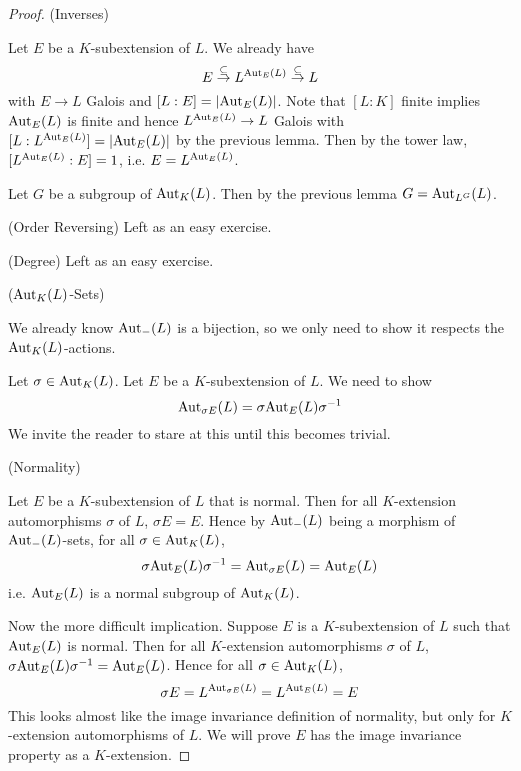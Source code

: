 \documentclass[../book.tex]{subfiles}
\begin{document}
\begin{proof}
    (Inverses)
        
        Let $E$ be a $K$-subextension of $L$. 
        We already have \[
            E \overset{\subseteq}{\to} L^{\text{Aut}_{E}(L)} \overset{\subseteq}{\to} L
        \]
        with $E \to L$ Galois and $[L : E] = |\text{Aut}_{E}(L)|$.
        Note that $[L : K]$ finite implies $\text{Aut}_{E}(L)$ is finite 
        and hence $L^{\text{Aut}_{E}(L)} \to L$ Galois
        with $[L : L^{\text{Aut}_{E}(L)}] = |\text{Aut}_{E}(L)|$ by the previous lemma. 
        Then by the tower law, $[L^{\text{Aut}_{E}(L)} : E] = 1$, i.e. $E = L^{\text{Aut}_{E}(L)}$.
        
        Let $G$ be a subgroup of $\text{Aut}_{K}(L)$. 
        Then by the previous lemma $G = \text{Aut}_{L^G}(L)$. 
        
    (Order Reversing) Left as an easy exercise. 
        
    (Degree) Left as an easy exercise.
    
    ($\text{Aut}_{K}(L)$-Sets) 
        
        We already know $\text{Aut}_{-}(L)$ is a bijection,
        so we only need to show it respects the $\text{Aut}_{K}(L)$-actions.
        
        Let $\sigma \in \text{Aut}_{K}(L)$. Let $E$ be a $K$-subextension of $L$. 
        We need to show \[
            \text{Aut}_{\sigma E}(L) = \sigma \text{Aut}_{E}(L) \sigma^{-1}
        \]
        We invite the reader to stare at this
        until this becomes trivial. 
    
    (Normality)
        
        Let $E$ be a $K$-subextension of $L$ that is normal. 
        Then for all $K$-extension automorphisms $\sigma$ of $L$, $\sigma E = E$. 
        Hence by $\text{Aut}_{-}(L)$ being a morphism of $\text{Aut}_{-}(L)$-sets,
        for all $\sigma \in \text{Aut}_{K}(L)$, \[
            \sigma \text{Aut}_{E}(L) \sigma^{-1} = \text{Aut}_{\sigma E}(L) = \text{Aut}_{E}(L)
        \]
        i.e. $\text{Aut}_{E}(L)$ is a normal subgroup of $\text{Aut}_{K}(L)$.
        
        Now the more difficult implication. 
        Suppose $E$ is a $K$-subextension of $L$ such that
        $\text{Aut}_{E}(L)$ is normal. 
        Then for all $K$-extension automorphisms $\sigma$ of $L$, 
        $\sigma \text{Aut}_{E}(L) \sigma^{-1} = \text{Aut}_{E}(L)$.
        Hence for all $\sigma \in \text{Aut}_{K}(L)$, \[
            \sigma E = L^{\text{Aut}_{\sigma E}(L)} = L^{\text{Aut}_{E}(L)} = E
        \]
        This looks almost like the image invariance definition of normality,
        but only for $K$-extension automorphisms of $L$. 
        We will prove $E$ has the image invariance property as a $K$-extension. 
        

\end{proof}
\end{document}
